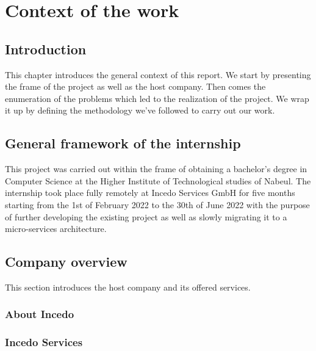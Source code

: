 \chapter{Context of the work}
\setcounter{secnumdepth}{3}
\newpage

\section*{Introduction}
This chapter introduces the general context of this report. We start by presenting the frame of the project as well as the host company. Then comes the enumeration of the problems which led to the realization of the project. We wrap it up by defining the methodology we’ve followed to carry out our work. \citep{test1}

\section{General framework of the internship}
This project was carried out within the frame of obtaining a bachelor’s degree in Computer Science at the Higher Institute of Technological studies of Nabeul. The internship took place fully remotely at Incedo Services GmbH for five months starting from the 1st of February 2022 to the 30th of June 2022 with the purpose of further developing the existing project as well as slowly migrating it to a micro-services architecture. \cite{test2}

\section{Company overview}
This section introduces the host company and its offered services.
\subsection{About Incedo}
\subsection{Incedo Services}

